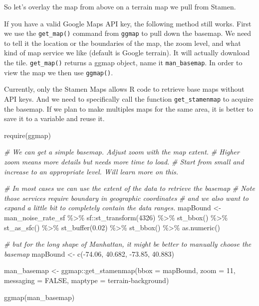 \documentclass[
  11pt,
]{book}
\newenvironment{Shaded}{\begin{snugshade}}{\end{snugshade}}
\newcommand{\AttributeTok}[1]{\textcolor[rgb]{0.77,0.63,0.00}{#1}}
\newcommand{\CommentTok}[1]{\textcolor[rgb]{0.56,0.35,0.01}{\textit{#1}}}
\newcommand{\ConstantTok}[1]{\textcolor[rgb]{0.00,0.00,0.00}{#1}}
\newcommand{\DecValTok}[1]{\textcolor[rgb]{0.00,0.00,0.81}{#1}}
\newcommand{\FloatTok}[1]{\textcolor[rgb]{0.00,0.00,0.81}{#1}}
\newcommand{\FunctionTok}[1]{\textcolor[rgb]{0.00,0.00,0.00}{#1}}
\newcommand{\NormalTok}[1]{#1}
\newcommand{\OtherTok}[1]{\textcolor[rgb]{0.56,0.35,0.01}{#1}}
\newcommand{\SpecialCharTok}[1]{\textcolor[rgb]{0.00,0.00,0.00}{#1}}
\newcommand{\StringTok}[1]{\textcolor[rgb]{0.31,0.60,0.02}{#1}}
\begin{document}
So let's overlay the map from above on a terrain map we pull from Stamen.

If you have a valid Google Maps API key, the following method still works. First we use the \texttt{get\_map()} command from \texttt{ggmap} to pull down the basemap. We need to tell it the location or the boundaries of the map, the zoom level, and what kind of map service we like (default is Google terrain). It will actually download the tile. \texttt{get\_map()} returns a ggmap object, name it \texttt{man\_basemap}. In order to view the map we then use \texttt{ggmap()}.

Currently, only the Stamen Maps allows R code to retrieve base maps without API keys. And we need to specifically call the function \texttt{get\_stamenmap} to acquire the basemap. If we plan to make multiples maps for the same area, it is better to save it to a variable and reuse it.

\begin{Shaded}
\begin{Highlighting}[]
\FunctionTok{require}\NormalTok{(ggmap)}

\CommentTok{\# We can get a simple basemap. Adjust zoom with the map extent. }
\CommentTok{\# Higher zoom means more details but needs more time to load.}
\CommentTok{\# Start from small and increase to an appropriate level. Will learn more on this.}

\CommentTok{\# In most cases we can use the extent of the data to retrieve the basemap}
\CommentTok{\# Note those services require boundary in geographic coordinates }
\CommentTok{\# and we also want to expand a little bit to completely contain the data ranges.}
\NormalTok{mapBound }\OtherTok{\textless{}{-}}\NormalTok{ man\_noise\_rate\_sf }\SpecialCharTok{\%\textgreater{}\%}\NormalTok{ sf}\SpecialCharTok{::}\FunctionTok{st\_transform}\NormalTok{(}\DecValTok{4326}\NormalTok{) }\SpecialCharTok{\%\textgreater{}\%} 
  \FunctionTok{st\_bbox}\NormalTok{() }\SpecialCharTok{\%\textgreater{}\%} \FunctionTok{st\_as\_sfc}\NormalTok{() }\SpecialCharTok{\%\textgreater{}\%} \FunctionTok{st\_buffer}\NormalTok{(}\FloatTok{0.02}\NormalTok{) }\SpecialCharTok{\%\textgreater{}\%}
  \FunctionTok{st\_bbox}\NormalTok{() }\SpecialCharTok{\%\textgreater{}\%} \FunctionTok{as.numeric}\NormalTok{()}

\CommentTok{\# but for the long shape of Manhattan, it might be better to manually choose the basemap}
\NormalTok{mapBound }\OtherTok{\textless{}{-}} \FunctionTok{c}\NormalTok{(}\SpecialCharTok{{-}}\FloatTok{74.06}\NormalTok{, }\FloatTok{40.682}\NormalTok{, }\SpecialCharTok{{-}}\FloatTok{73.85}\NormalTok{, }\FloatTok{40.883}\NormalTok{)}

\NormalTok{man\_basemap }\OtherTok{\textless{}{-}}\NormalTok{ ggmap}\SpecialCharTok{::}\FunctionTok{get\_stamenmap}\NormalTok{(}\AttributeTok{bbox =}\NormalTok{ mapBound, }\AttributeTok{zoom =} \DecValTok{11}\NormalTok{, }\AttributeTok{messaging =} \ConstantTok{FALSE}\NormalTok{, }\AttributeTok{maptype =} \StringTok{\textquotesingle{}terrain{-}background\textquotesingle{}}\NormalTok{)}

\FunctionTok{ggmap}\NormalTok{(man\_basemap)}
\end{Highlighting}
\end{Shaded}
\end{document}
